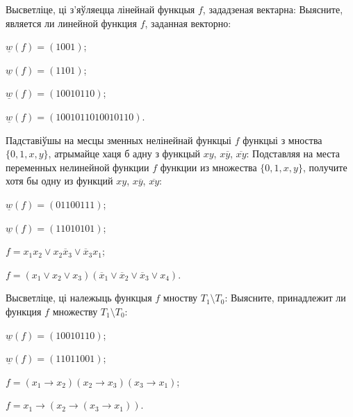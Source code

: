 \documentclass[12pt, a4paper]{article}
\begin{document}
\begin{problemList}
\problemItemWithCommonPart
{Высветліце, ці з'яўляецца лінейнай функцыя $f$, зададзеная вектарна:}
{Выясните, является ли линейной функция $f$, заданная векторно:}
{%
\begin{belarusianEnumerateTwocol}
    \item $\underline{w}(f)=(1001)$;
    \item $\underline{w}(f)=(1101)$;
    \item $\underline{w}(f)=(10010110)$;
    \item $\underline{w}(f)=(1001011010010110)$.
\end{belarusianEnumerateTwocol}
}

\smallskip

\problemItemWithCommonPart
{Падставіўшы на месцы зменных нелінейнай функцыі $f$ функцыі з мноства $\{0, 1, x, y\}$,
атрымайце хаця б адну з функцый $xy$, $x\overline{y}$, $\overline{xy}$:}
{Подставляя на места переменных нелинейной функции $f$ функции из множества $\{0, 1, x, y\}$,
получите хотя бы одну из функций $xy$, $x\overline{y}$, $\overline{xy}$:}
{%
\begin{belarusianEnumerateTwocol}
    \item $\underline{w}(f)=(01100111)$;
    \item $\underline{w}(f)=(11010101)$;
    \item $f=x_1x_2\vee x_2\overline{x}_3\vee \overline{x}_3x_1$;
    \item $f=(x_1\vee x_2\vee x_3)(\overline{x}_1\vee \overline{x}_2\vee \overline{x}_3\vee x_4)$.
\end{belarusianEnumerateTwocol}
}

\smallskip

\problemItemWithCommonPart
{Высветліце, ці належыць функцыя $f$ мноству $T_1\setminus T_0$:}
{Выясните, принадлежит ли функция $f$ множеству $T_1\setminus T_0$:}
{%
\begin{belarusianEnumerateTwocol}
    \item $\underline{w}(f)=(10010110)$;
    \item $\underline{w}(f)=(11011001)$;
    \item $f=(x_1\rightarrow x_2)(x_2\rightarrow x_3)(x_3 \rightarrow x_1)$;
    \item $f=x_1\rightarrow (x_2 \rightarrow (x_3 \rightarrow x_1))$.
\end{belarusianEnumerateTwocol}
}

\smallskip


\end{problemList}
\end{document}
